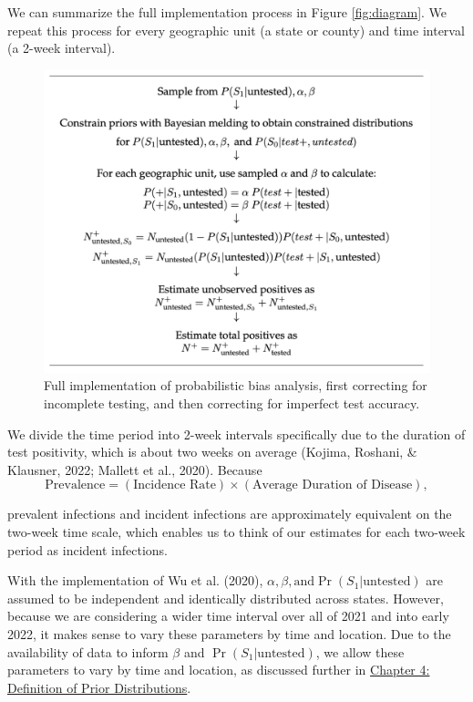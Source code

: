 \documentclass[12pt,twoside]{smiththesis}
\begin{document}
We can summarize the full implementation process in Figure \ref{fig:diagram}. We repeat this process for every geographic unit (a state or county) and time interval (a 2-week interval).
\begin{figure}

{\centering \includegraphics[width=0.9\linewidth]{./figure/analysis_diagram} 

}

\caption{\label{fig:diagram}Full implementation of probabilistic bias analysis, first correcting for incomplete testing, and then correcting for imperfect test accuracy.}\label{fig:unnamed-chunk-8}
\end{figure}
We divide the time period into 2-week intervals specifically due to the duration of test positivity, which is about two weeks on average (Kojima, Roshani, \& Klausner, 2022; Mallett et al., 2020). Because
\[ \text{Prevalence} = (\text{Incidence Rate}) \times (\text{Average Duration of Disease}), \]

\noindent prevalent infections and incident infections are approximately equivalent on the two-week time scale, which enables us to think of our estimates for each two-week period as incident infections.

With the implementation of Wu et al. (2020), \(\alpha, \beta, \text{and} \Pr(S_1|\text{untested})\) are assumed to be independent and identically distributed across states. However, because we are considering a wider time interval over all of 2021 and into early 2022, it makes sense to vary these parameters by time and location. Due to the availability of data to inform \(\beta\) and \(\Pr(S_1|\text{untested})\), we allow these parameters to vary by time and location, as discussed further in \protect\hyperlink{defpriors}{Chapter 4: Definition of Prior Distributions}.
\end{document}
